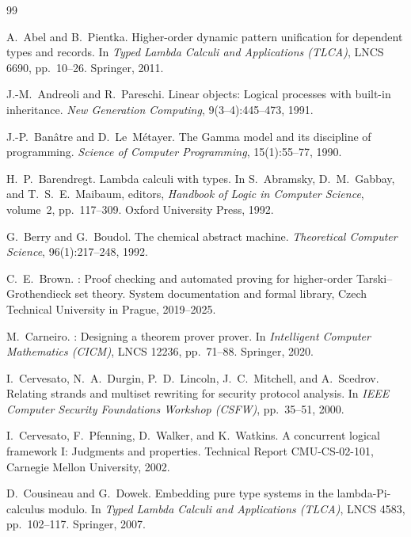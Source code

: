 \documentclass[11pt,a4paper]{article}
\theoremstyle{definition}
\begin{document}
\begin{thebibliography}{99}

A.~Abel and B.~Pientka.
\newblock Higher-order dynamic pattern unification for dependent types and records.
\newblock In \emph{Typed Lambda Calculi and Applications (TLCA)}, LNCS 6690, pp.\ 10--26. Springer, 2011.

J.-M.~Andreoli and R.~Pareschi.
\newblock Linear objects: Logical processes with built-in inheritance.
\newblock \emph{New Generation Computing}, 9(3--4):445--473, 1991.

J.-P.~Ban\^{a}tre and D.~Le~M\'{e}tayer.
\newblock The Gamma model and its discipline of programming.
\newblock \emph{Science of Computer Programming}, 15(1):55--77, 1990.

H.~P.~Barendregt.
\newblock Lambda calculi with types.
\newblock In S.~Abramsky, D.~M.~Gabbay, and T.~S.~E.~Maibaum, editors, \emph{Handbook of Logic in Computer Science}, volume~2, pp.\ 117--309. Oxford University Press, 1992.

G.~Berry and G.~Boudol.
\newblock The chemical abstract machine.
\newblock \emph{Theoretical Computer Science}, 96(1):217--248, 1992.

C.~E.~Brown.
: Proof checking and automated proving for higher-order {Tarski--Grothendieck} set theory.
\newblock System documentation and formal library, Czech Technical University in Prague, 2019--2025.

M.~Carneiro.
: Designing a theorem prover prover.
\newblock In \emph{Intelligent Computer Mathematics (CICM)}, LNCS 12236, pp.\ 71--88. Springer, 2020.

I.~Cervesato, N.~A.~Durgin, P.~D.~Lincoln, J.~C.~Mitchell, and A.~Scedrov.
\newblock Relating strands and multiset rewriting for security protocol analysis.
\newblock In \emph{IEEE Computer Security Foundations Workshop (CSFW)}, pp.\ 35--51, 2000.

I.~Cervesato, F.~Pfenning, D.~Walker, and K.~Watkins.
\newblock A concurrent logical framework {I}: Judgments and properties.
\newblock Technical Report CMU-CS-02-101, Carnegie Mellon University, 2002.

D.~Cousineau and G.~Dowek.
\newblock Embedding pure type systems in the lambda-Pi-calculus modulo.
\newblock In \emph{Typed Lambda Calculi and Applications (TLCA)}, LNCS 4583, pp.\ 102--117. Springer, 2007.


\end{thebibliography}
\end{document}
